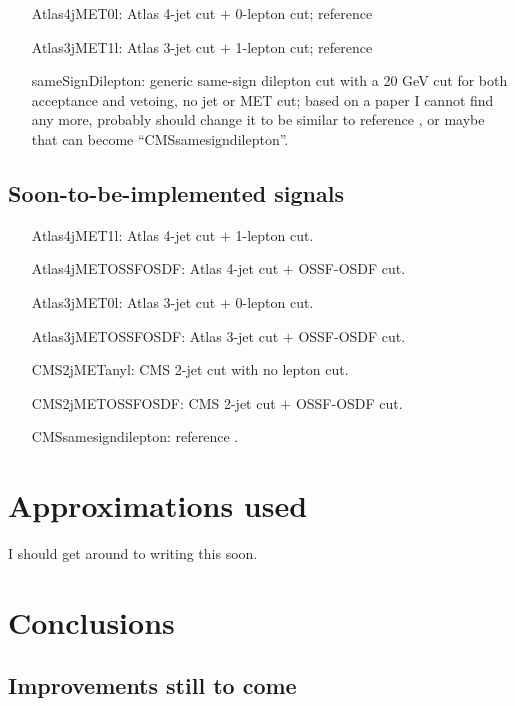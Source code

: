\documentclass[10pt]{article}
\begin{document}
\begin{itemize}

\item[Atlas4jMET0l:] Atlas 4-jet cut $+$ 0-lepton cut;
                     reference \cite{ATLAS:1278474}

\item[Atlas3jMET1l:] Atlas 3-jet cut $+$ 1-lepton cut;
                     reference \cite{ATLAS:1278474}

\item[sameSignDilepton:] generic same-sign dilepton cut with a 20 GeV cut for
                         both acceptance and vetoing, no jet or MET cut;
                         based on a paper I cannot find any more, probably
                         should change it to be similar to reference
                         \cite{Chatrchyan:2011wba}, or maybe that can become
                         ``CMSsamesigndilepton''.

\end{itemize}


\subsection{Soon-to-be-implemented signals}
\label{subsec:soonSignals}

\begin{itemize}

\item[Atlas4jMET1l:] Atlas 4-jet cut $+$ 1-lepton cut.

\item[Atlas4jMETOSSFOSDF:] Atlas 4-jet cut $+$ OSSF-OSDF cut.

\item[Atlas3jMET0l:] Atlas 3-jet cut $+$ 0-lepton cut.

\item[Atlas3jMETOSSFOSDF:] Atlas 3-jet cut $+$ OSSF-OSDF cut.

\item[CMS2jMETanyl:] CMS 2-jet cut with no lepton cut.

\item[CMS2jMETOSSFOSDF:] CMS 2-jet cut $+$ OSSF-OSDF cut.

\item[CMSsamesigndilepton:] reference \cite{Chatrchyan:2011wba}.

\end{itemize}


\section{Approximations used}
\label{sec:approximations}

I should get around to writing this soon.


\section{Conclusions}
\label{sec:conclusions}


\begin{appendix}

\section{Improvements still to come}
\label{app:improvements}


\end{appendix}


\end{document}
